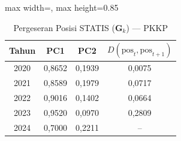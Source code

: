 \begin{table}[H]
\centering
\caption{Pergeseran Posisi STATIS ($\mathbf{G}_k$) --- PKKP} \label{tab:app2jarak_statis_loading_pkkp}
\begin{adjustbox}{max width=\textwidth, max height=0.85\textheight}
\begin{tabular}{|c|c|c|c|}
\hline
\textbf{Tahun} & \textbf{PC1} & \textbf{PC2} & \textbf{$D(\text{pos}_t, \text{pos}_{t+1})$} \\
\hline
2020 & 0,8652 & 0,1939 & 0,0075 \\
2021 & 0,8589 & 0,1979 & 0,0717 \\
2022 & 0,9016 & 0,1402 & 0,0664 \\
2023 & 0,9520 & 0,0970 & 0,2809 \\
2024 & 0,7000 & 0,2211 & -- \\
\hline
\end{tabular}
\end{adjustbox}
\end{table}